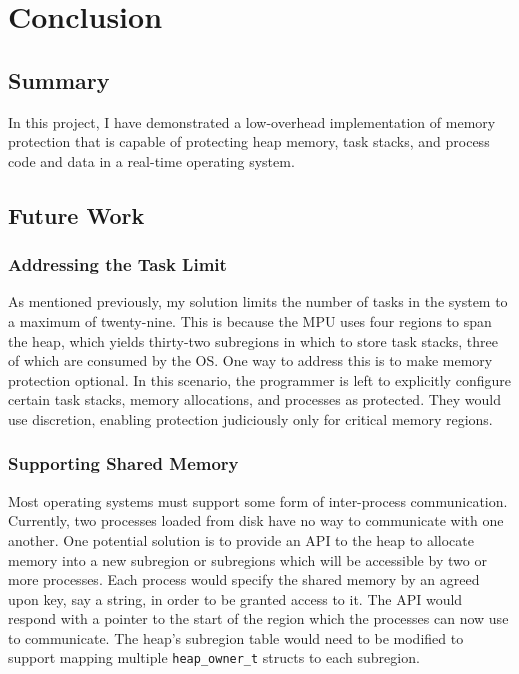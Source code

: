 
\chapter{Conclusion}

\section{Summary}

In this project, I have demonstrated a low-overhead implementation of memory protection that is capable of protecting heap memory, task stacks, and process code and data in a real-time operating system.

\section{Future Work}

\subsection{Addressing the Task Limit}

As mentioned previously, my solution limits the number of tasks in the system to a maximum of twenty-nine. This is because the MPU uses four regions to span the heap, which yields thirty-two subregions in which to store task stacks, three of which are consumed by the OS. One way to address this is to make memory protection optional. In this scenario, the programmer is left to explicitly configure certain task stacks, memory allocations, and processes as protected. They would use discretion, enabling protection judiciously only for critical memory regions.

\subsection{Supporting Shared Memory}

Most operating systems must support some form of inter-process communication. Currently, two processes loaded from disk have no way to communicate with one another. One potential solution is to provide an API to the heap to allocate memory into a new subregion or subregions which will be accessible by two or more processes. Each process would specify the shared memory by an agreed upon key, say a string, in order to be granted access to it. The API would respond with a pointer to the start of the region which the processes can now use to communicate. The heap's subregion table would need to be modified to support mapping multiple \texttt{heap\_owner\_t} structs to each subregion.

